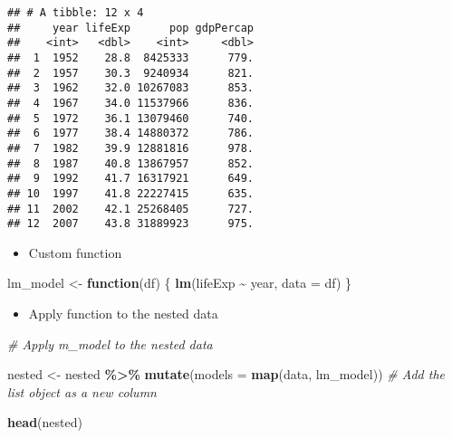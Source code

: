 \documentclass[
]{book}
\newenvironment{Shaded}{\begin{snugshade}}{\end{snugshade}}
\newcommand{\CommentTok}[1]{\textcolor[rgb]{0.56,0.35,0.01}{\textit{#1}}}
\newcommand{\ControlFlowTok}[1]{\textcolor[rgb]{0.13,0.29,0.53}{\textbf{#1}}}
\newcommand{\DataTypeTok}[1]{\textcolor[rgb]{0.13,0.29,0.53}{#1}}
\newcommand{\DecValTok}[1]{\textcolor[rgb]{0.00,0.00,0.81}{#1}}
\newcommand{\KeywordTok}[1]{\textcolor[rgb]{0.13,0.29,0.53}{\textbf{#1}}}
\newcommand{\NormalTok}[1]{#1}
\newcommand{\OperatorTok}[1]{\textcolor[rgb]{0.81,0.36,0.00}{\textbf{#1}}}
\newcommand{\StringTok}[1]{\textcolor[rgb]{0.31,0.60,0.02}{#1}}
\providecommand{\tightlist}{%
  \setlength{\itemsep}{0pt}\setlength{\parskip}{0pt}}
\begin{document}
\begin{Shaded}
\end{Shaded}

\begin{verbatim}
## # A tibble: 12 x 4
##     year lifeExp      pop gdpPercap
##    <int>   <dbl>    <int>     <dbl>
##  1  1952    28.8  8425333      779.
##  2  1957    30.3  9240934      821.
##  3  1962    32.0 10267083      853.
##  4  1967    34.0 11537966      836.
##  5  1972    36.1 13079460      740.
##  6  1977    38.4 14880372      786.
##  7  1982    39.9 12881816      978.
##  8  1987    40.8 13867957      852.
##  9  1992    41.7 16317921      649.
## 10  1997    41.8 22227415      635.
## 11  2002    42.1 25268405      727.
## 12  2007    43.8 31889923      975.
\end{verbatim}

\begin{itemize}
\tightlist
\item
  Custom function
\end{itemize}

\begin{Shaded}
\begin{Highlighting}[]
\NormalTok{lm\_model \textless{}{-}}\StringTok{ }\ControlFlowTok{function}\NormalTok{(df) \{}
  \KeywordTok{lm}\NormalTok{(lifeExp }\OperatorTok{\textasciitilde{}}\StringTok{ }\NormalTok{year, }\DataTypeTok{data =}\NormalTok{ df)}
\NormalTok{\}}
\end{Highlighting}
\end{Shaded}

\begin{itemize}
\tightlist
\item
  Apply function to the nested data
\end{itemize}

\begin{Shaded}
\begin{Highlighting}[]
\CommentTok{\# Apply m\_model to the nested data}

\NormalTok{nested \textless{}{-}}\StringTok{ }\NormalTok{nested }\OperatorTok{\%\textgreater{}\%}
\StringTok{  }\KeywordTok{mutate}\NormalTok{(}\DataTypeTok{models =} \KeywordTok{map}\NormalTok{(data, lm\_model)) }\CommentTok{\# Add the list object as a new column}

\KeywordTok{head}\NormalTok{(nested)}
\end{Highlighting}
\end{Shaded}
\end{document}
